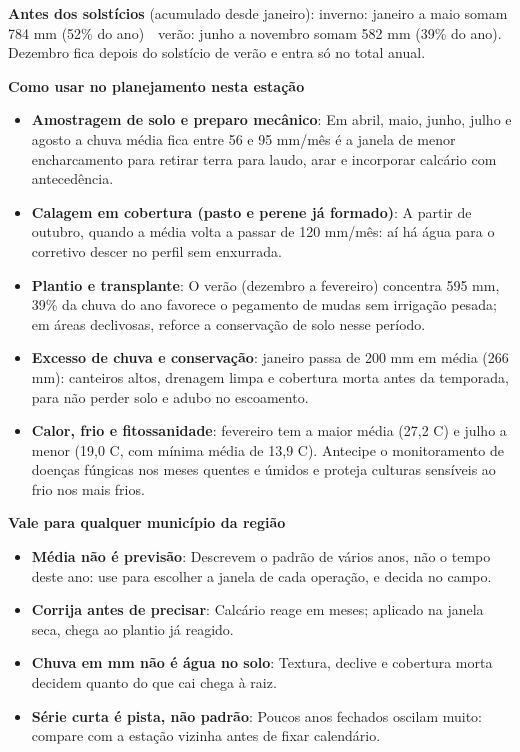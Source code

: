 \documentclass[10pt,a4paper]{article}
\begin{document}
\vspace{1pt}
{\footnotesize\textbf{Antes dos solstícios} (acumulado desde janeiro):
inverno: janeiro a maio somam 784 mm (52\% do ano) \,\textbullet\, verão: junho a novembro somam 582 mm (39\% do ano). Dezembro fica depois do solstício de verão e entra só no total
anual.}

\vspace{2pt}
{\bfseries\small Como usar no planejamento nesta estação}

\footnotesize\begin{itemize}\setlength{\itemsep}{0.5pt}
  \item \textbf{Amostragem de solo e preparo mecânico}: Em abril, maio, junho, julho e agosto a chuva média fica entre 56 e 95 mm/mês \textemdash{} é a janela de menor encharcamento para retirar terra para laudo, arar e incorporar calcário com antecedência.
  \item \textbf{Calagem em cobertura (pasto e perene já formado)}: A partir de outubro, quando a média volta a passar de 120 mm/mês: aí há água para o corretivo descer no perfil sem enxurrada.
  \item \textbf{Plantio e transplante}: O verão (dezembro a fevereiro) concentra 595 mm, 39\% da chuva do ano \textemdash{} favorece o pegamento de mudas sem irrigação pesada; em áreas declivosas, reforce a conservação de solo nesse período.
  \item \textbf{Excesso de chuva e conservação}: janeiro passa de 200 mm em média (266 mm): canteiros altos, drenagem limpa e cobertura morta antes da temporada, para não perder solo e adubo no escoamento.
  \item \textbf{Calor, frio e fitossanidade}: fevereiro tem a maior média (27,2 \textdegree{}C) e julho a menor (19,0 \textdegree{}C, com mínima média de 13,9 \textdegree{}C). Antecipe o monitoramento de doenças fúngicas nos meses quentes e úmidos e proteja culturas sensíveis ao frio nos mais frios.
\end{itemize}

\vspace{1pt}
{\bfseries\small Vale para qualquer município da região}

\scriptsize\begin{itemize}\setlength{\itemsep}{0.5pt}
  \item \textbf{Média não é previsão}: Descrevem o padrão de vários anos, não o tempo deste ano: use para escolher a janela de cada operação, e decida no campo.
  \item \textbf{Corrija antes de precisar}: Calcário reage em meses; aplicado na janela seca, chega ao plantio já reagido.
  \item \textbf{Chuva em mm não é água no solo}: Textura, declive e cobertura morta decidem quanto do que cai chega à raiz.
  \item \textbf{Série curta é pista, não padrão}: Poucos anos fechados oscilam muito: compare com a estação vizinha antes de fixar calendário.
\end{itemize}
\end{document}
